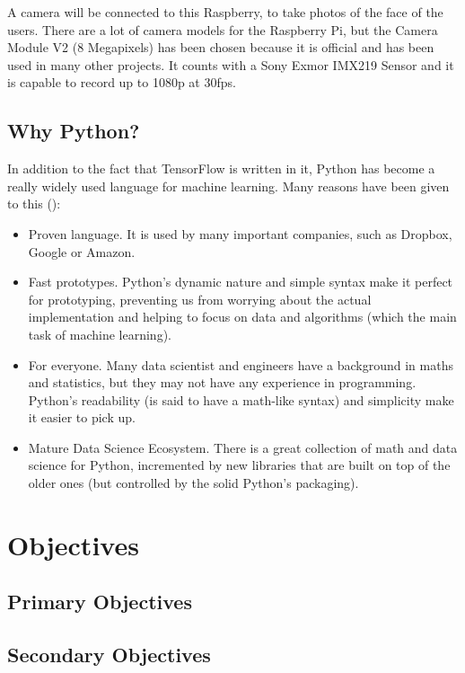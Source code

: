	A camera will be connected to this Raspberry, to take photos of the face of the users. There are a lot of camera models for the Raspberry Pi, but the Camera Module V2 (8 Megapixels) has been chosen because it is official and has been used in many other projects. It counts with a Sony Exmor IMX219 Sensor and it is capable to record up to 1080p at 30fps.

	\subsection{Why Python?}
	In addition to the fact that TensorFlow is written in it, Python has become a really widely used language for machine learning. Many reasons have been given to this (\cite{why_python}):

	\begin{itemize}
		\item Proven language. It is used by many important companies, such as Dropbox, Google or Amazon. 
		\item Fast prototypes. Python's dynamic nature and simple syntax make it perfect for prototyping, preventing us from worrying about the actual implementation and helping to focus on data and algorithms (which the main task of machine learning).
		\item For everyone. Many data scientist and engineers have a background in maths and statistics, but they may not have any experience in programming. Python's readability (is said to have a math-like syntax) and simplicity make it easier to pick up.
		\item Mature Data Science Ecosystem. There is a great collection of math and data science for Python, incremented by new libraries that are built on top of the older ones (but controlled by the solid Python's packaging). 
	\end{itemize}

\section{Objectives}
	\subsection{Primary Objectives}
	\subsection{Secondary Objectives}

